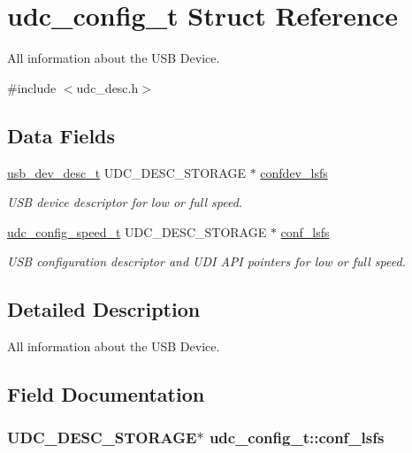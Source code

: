 \hypertarget{structudc__config__t}{
\section{udc\-\_\-config\-\_\-t \-Struct \-Reference}
\label{structudc__config__t}
}


\-All information about the \-U\-S\-B \-Device.  




{\ttfamily \#include $<$udc\-\_\-desc.\-h$>$}

\subsection*{\-Data \-Fields}
\begin{DoxyCompactItemize}
\item 
\hyperlink{structusb__dev__desc__t}{usb\-\_\-dev\-\_\-desc\-\_\-t} \-U\-D\-C\-\_\-\-D\-E\-S\-C\-\_\-\-S\-T\-O\-R\-A\-G\-E $\ast$ \hyperlink{structudc__config__t_abbb89807817f4e602e20c6ebdfb26741}{confdev\-\_\-lsfs}
\begin{DoxyCompactList}\small\item\em \-U\-S\-B device descriptor for low or full speed. \end{DoxyCompactList}\item 
\hyperlink{structudc__config__speed__t}{udc\-\_\-config\-\_\-speed\-\_\-t} \*
\-U\-D\-C\-\_\-\-D\-E\-S\-C\-\_\-\-S\-T\-O\-R\-A\-G\-E $\ast$ \hyperlink{structudc__config__t_a681102302c24cb986cdd7af3bee6d976}{conf\-\_\-lsfs}
\begin{DoxyCompactList}\small\item\em \-U\-S\-B configuration descriptor and \-U\-D\-I \-A\-P\-I pointers for low or full speed. \end{DoxyCompactList}\end{DoxyCompactItemize}


\subsection{\-Detailed \-Description}
\-All information about the \-U\-S\-B \-Device. 

\subsection{\-Field \-Documentation}
\hypertarget{structudc__config__t_a681102302c24cb986cdd7af3bee6d976}{
\subsubsection[{conf\-\_\-lsfs}]{ \-U\-D\-C\-\_\-\-D\-E\-S\-C\-\_\-\-S\-T\-O\-R\-A\-G\-E$\ast$ {\bf udc\-\_\-config\-\_\-t\-::conf\-\_\-lsfs}}}
\label{structudc__config__t_a681102302c24cb986cdd7af3bee6d976}


